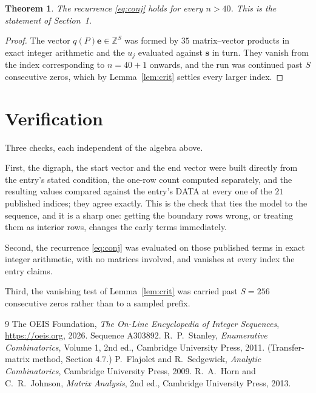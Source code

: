 \documentclass[11pt,a4paper]{article}
\theoremstyle{plain}
\newtheorem{theorem}{Theorem}
\theoremstyle{definition}
\begin{document}
\begin{theorem}
The recurrence \eqref{eq:conj} holds for every $n>40$. This is the statement of
Section~1.
\end{theorem}

\begin{proof}
The vector $q(P)\mathbf{e}\in\mathbb{Z}^{S}$ was formed by $35$ matrix--vector
products in exact integer arithmetic and the $u_j$ evaluated against $\mathbf{s}$ in turn.
They vanish from the index corresponding to $n=40+1$ onwards, and the run was continued
past $S$ consecutive zeros, which by Lemma~\ref{lem:crit} settles every larger index.
\end{proof}

\section{Verification}

Three checks, each independent of the algebra above.

First, the digraph, the start vector and the end vector were built directly from the
entry's stated condition, the one-row count computed separately, and the resulting values
compared against the entry's DATA at every one of the $21$ published indices; they
agree exactly. This is the check that ties the model to the sequence, and it is a sharp one:
getting the boundary rows wrong, or treating them as interior rows, changes the early terms
immediately.

Second, the recurrence \eqref{eq:conj} was evaluated on those published terms in exact
integer arithmetic, with no matrices involved, and vanishes at every index the entry claims.

Third, the vanishing test of Lemma~\ref{lem:crit} was carried past $S=256$ consecutive
zeros rather than to a sampled prefix.

\begin{thebibliography}{9}
 The OEIS Foundation, \emph{The On-Line Encyclopedia of Integer
Sequences}, \url{https://oeis.org}, 2026. Sequence A303892.
 R.~P.~Stanley, \emph{Enumerative Combinatorics}, Volume 1, 2nd ed.,
Cambridge University Press, 2011. (Transfer-matrix method, Section 4.7.)
 P.~Flajolet and R.~Sedgewick, \emph{Analytic Combinatorics}, Cambridge
University Press, 2009.
 R.~A.~Horn and C.~R.~Johnson, \emph{Matrix Analysis}, 2nd ed., Cambridge
University Press, 2013.
\end{thebibliography}
\end{document}
